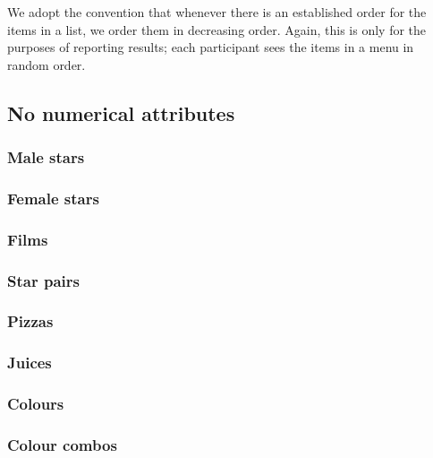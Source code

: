 \documentclass[11pt,letter]{article}
\newcommand{\menu}{menu}
\begin{document}
We adopt the convention that whenever there is an established order for the items in a list, we order them in decreasing order.
Again, this is only for the purposes of reporting results; each participant sees the items in a \menu{} in random order.

\subsection{No numerical attributes}

\subsubsection{Male stars}



\subsubsection{Female stars}



\subsubsection{Films}



\subsubsection{Star pairs}



\subsubsection{Pizzas}



\subsubsection{Juices}



\subsubsection{Colours}



\subsubsection{Colour combos}
\end{document}
